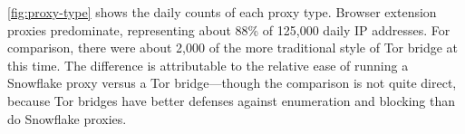 \documentclass[letterpaper,twocolumn]{article}
\begin{document}
\autoref{fig:proxy-type} shows the daily counts
of each proxy type.
Browser extension proxies predominate,
representing about 88\%
of 125,000 daily IP addresses.
For comparison, there were about 2,000
of the more traditional style of Tor bridge at this time.
The difference is attributable to the relative ease
of running a Snowflake proxy versus a Tor bridge---though
the comparison is not quite direct,
because Tor bridges have better defenses
against enumeration and blocking than do Snowflake proxies.
\end{document}
